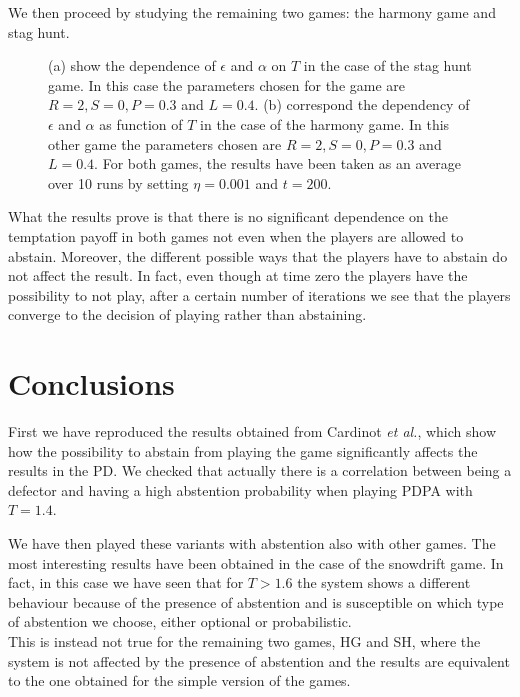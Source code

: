 \documentclass[12pt,oneside,a4paper,fleqn]{article}
\begin{document}
We then proceed by studying the remaining two games: the harmony game and stag hunt. 
\begin{figure}[H]
    \centering
    \caption{(a) show the dependence of $\epsilon$ and $\alpha$ on $T$ in the case of the stag hunt game. In this case the parameters chosen for the game are $R = 2, S = 0, P = 0.3$ and $L = 0.4$. (b) correspond the dependency of $\epsilon$ and $\alpha$ as function of $T$ in the case of the harmony game. In this other game the parameters chosen are $R = 2, S = 0, P = 0.3$ and $L = 0.4$. For both games, the results have been taken as an average over 10 runs by setting $\eta = 0.001$ and $t = 200$.}
    \label{fig: harmony game and stug hunt}
\end{figure}

What the results prove is that there is no significant dependence on the temptation payoff in both games not even when the players are allowed to abstain.
Moreover, the different possible ways that the players have to abstain do not affect the result.
In fact, even though at time zero the players have the possibility to not play, after a certain number of iterations we see that the players converge to the decision of playing rather than abstaining.

\section{Conclusions}
\label{sec:conclusions}
First we have reproduced the results obtained from Cardinot \emph{et al.}, which show how the possibility to abstain from playing the game significantly affects the results in the PD.
We checked that actually there is a correlation between being a defector and having a high abstention probability when playing PDPA with $T = 1.4$.

We have then played these variants with abstention also with other games.
The most interesting results have been obtained in the case of the snowdrift game.
In fact, in this case we have seen that for $T > 1.6$ the system shows a different behaviour because of the presence of abstention and is susceptible on which type of abstention we choose, either optional or probabilistic.\\
This is instead not true for the remaining two games, HG and SH, where the system is not affected by the presence of abstention and the results are equivalent to the one obtained for the simple version of the games.


%
%    
%    

\newpage

\printbibliography
\end{document}
